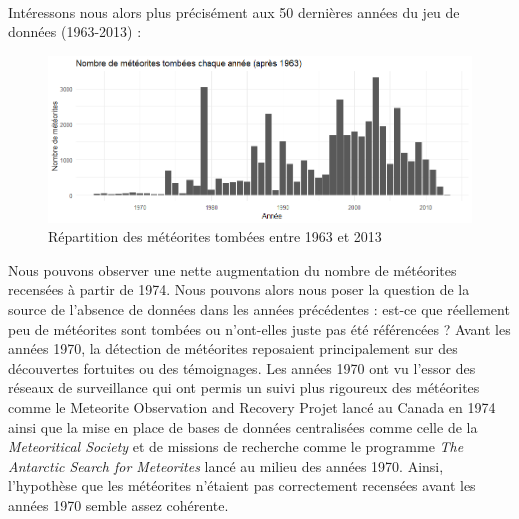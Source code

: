 \documentclass[12pt]{article}
\begin{document}
\\
Intéressons nous alors plus précisément aux 50 dernières années du jeu de données (1963-2013) :\\
\begin{figure}[H]
\centering
\includegraphics[width=16cm]{Images/exploration/histogramme1963-2013.png}
\caption{Répartition des météorites tombées entre 1963 et 2013}
\end{figure}
Nous pouvons observer une nette augmentation du nombre de météorites recensées à partir de 1974. Nous pouvons alors nous poser la question de la source de l'absence de données dans les années précédentes : est-ce que réellement peu de météorites sont tombées ou n'ont-elles juste pas été référencées ? Avant les années 1970, la détection de météorites reposaient principalement sur des découvertes fortuites ou des témoignages. Les années 1970 ont vu l'essor des réseaux de surveillance qui ont permis un suivi plus rigoureux des météorites comme le Meteorite Observation and Recovery Projet \cite{Article_Canada_1970} lancé au Canada en 1974 ainsi que la mise en place de bases de données centralisées comme celle de la \textit{Meteoritical Society} \cite{BDD_centralisees} et de missions de recherche comme le programme \textit{The Antarctic Search for Meteorites} \cite{Mission_recherche_antartictique} lancé au milieu des années 1970. Ainsi, l'hypothèse que les météorites n'étaient pas correctement recensées avant les années 1970 semble assez cohérente.
\end{document}

